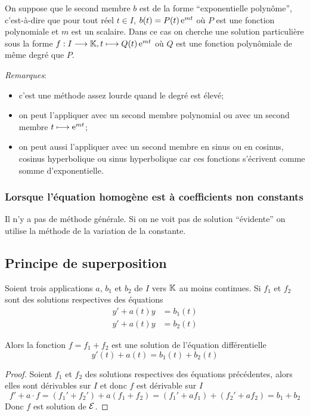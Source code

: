 On suppose que le second membre \(b\) est de la forme ``exponentielle 
polynôme'', c'est-à-dire que pour tout réel \(t \in I\), \(b(t) = P(t) \operatorname{e}^{mt}\) 
où \(P\) est une fonction polynomiale et \(m\) est un scalaire. Dans ce cas on 
cherche une solution particulière sous la forme 
\(f:I \longrightarrow \mathbb{K}, t \longmapsto Q(t)\operatorname{e}^{mt}\) où \(Q\) est une fonction polynômiale 
de même degré que \(P\).

\emph{Remarques}:
\begin{itemize}
    \item c'est une méthode assez lourde quand le degré est élevé;
    \item on peut l'appliquer avec un second membre polynomial ou avec un second 
        membre \(t \longmapsto \operatorname{e}^{mt}\);
    \item on peut aussi l'appliquer avec un second membre en sinus ou en 
        cosinus, cosinus hyperbolique ou sinus hyperbolique car ces fonctions 
        s'écrivent comme somme d'exponentielle.
\end{itemize}

\subsubsection{Lorsque l'équation homogène est à coefficients non constants}
\label{subsubsec:recherchesolutionpart-coefnnconstants}

Il n'y a pas de méthode générale. Si on ne voit pas de solution ``évidente'' on 
utilise la méthode de la variation de la constante.

\subsection{Principe de superposition}
\label{subsec:principesuperposition}

\begin{prop}
    Soient trois applications \(a\), \(b_1\) et \(b_2\) de \(I\) vers \(\mathbb{K}\) au 
    moins continues. Si \(f_1\) et \(f_2\) sont des solutions respectives des 
    équations    
    \begin{align}
        y' + a(t)y& = b_1(t)\\ 
        y' + a(t)y& = b_2(t)
    \end{align}

    Alors la fonction \(f = f_1 + f_2\) est une solution de l'équation différentielle 
    \begin{equation}
        y'(t) + a(t) = b_1(t) + b_2(t)
    \end{equation}
\end{prop}
\begin{proof}
    Soient \(f_1\) et \(f_2\) des solutions respectives des équations 
    précédentes, alors elles sont dérivables sur \(I\) et donc \(f\) est 
    dérivable sur \(I\)
    \begin{equation}
        f' + a \cdot f = (f_1' + f_2') + a(f_1 + f_2) = (f_1' + af_1) + (f_2' + 
        af_2) = b_1 + b_2
    \end{equation}
    Donc \(f\) est solution de \(\mathcal{E}\).
\end{proof}

